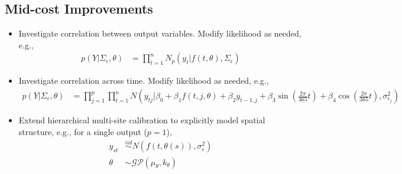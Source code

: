 \documentclass[12pt]{article}
\begin{document}
\subsection{Mid-cost Improvements}
\begin{itemize}
\item Investigate correlation between output variables. Modify likelihood as needed, e.g.,
	\begin{align}
	p(Y|\Sigma_\epsilon, \theta) &= \prod_{t = 1}^{n} N_p(y_{t}|f(t, \theta), \Sigma_{\epsilon}) \label{ind_output_corr}
	\end{align}
\item Investigate correlation across time. Modify likelihood as needed, e.g., 
	\begin{align}
	p(Y|\Sigma_\epsilon, \theta) &= \prod_{j = 1}^{p} \prod_{t = 1}^{n} N\left(y_{tj}|\beta_0 + \beta_1 f(t, j, \theta) + \beta_2 y_{t-1,j} + \beta_3 \sin\left(\frac{2\pi}{365}t\right) + \beta_4 \cos\left(\frac{2\pi}{365}t\right), \sigma^2_{\epsilon_j}\right) \label{ind_autocorr}
	\end{align}
\item Extend hierarchical multi-site calibration to explicitly model spatial structure, e.g., for a single output ($p=1$), 
	\begin{align}
	y_{st} &\overset{iid}{\sim} N(f(t, \theta(s)), \sigma^2_\epsilon) \\
	\theta &\sim \mathcal{GP}(\mu_\theta, k_\theta)
	\end{align}
\end{itemize}
\end{document}
